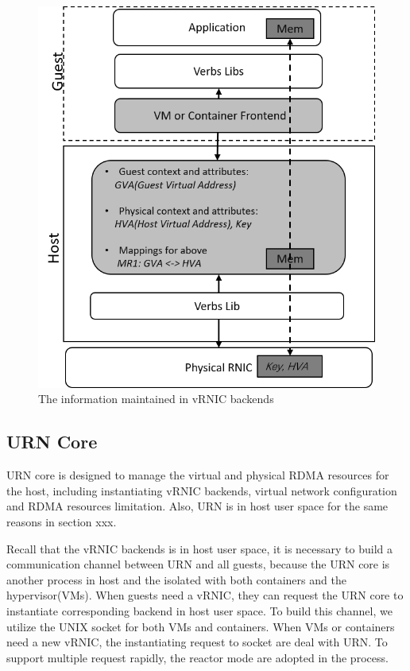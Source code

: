 \begin{figure}[!ht]
	\centering
	\includegraphics[width=0.8\linewidth]{images/vrnic-backend.png}
	\caption{The information maintained in vRNIC backends}
	\label{fig:route-config}
\end{figure}


\subsection{URN Core}
URN core is designed to manage the virtual and physical RDMA resources for the host, including instantiating vRNIC backends, virtual network configuration and RDMA resources limitation. Also, URN is in host user space for the same reasons in section xxx.

Recall that the vRNIC backends is in host user space, it is necessary to build a communication channel between URN and all guests, because the URN core is another process in host and the isolated with both containers and the hypervisor(VMs). When guests need a vRNIC, they can request the URN core to instantiate corresponding backend in host user space. To build this channel, we utilize the UNIX socket for both VMs and containers. When VMs or containers need a new vRNIC, the instantiating request to socket are deal with URN. To support multiple request rapidly, the reactor mode are adopted in the process. 


